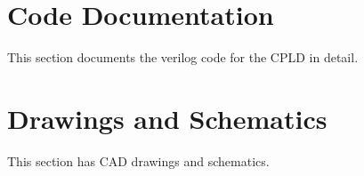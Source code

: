 \documentclass[usletter]{article}
\begin{document}
  

  \section{Code Documentation}
  \par
  This section documents the verilog code for the CPLD in detail.

  

  \section{Drawings and Schematics}
  \par
  This section has CAD drawings and schematics.

  
\end{document}
